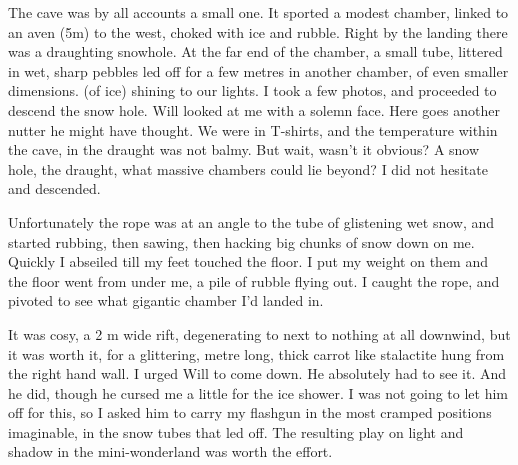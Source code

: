 The cave was by all accounts a small one. It sported a modest chamber, linked to an aven (5m) to the west, choked with ice and rubble. Right by the landing there was a draughting snowhole. At the far end of the chamber, a small tube, littered in wet, sharp pebbles led off for  a few metres in another chamber, of even smaller dimensions.  (of ice) shining to our lights. I took a few photos, and proceeded to descend the snow hole. Will looked at me with a solemn face. Here goes another nutter he might have thought. We were in T-shirts, and the temperature within the cave, in the draught was not balmy. But wait, wasn't it obvious? A snow hole, the draught, what massive chambers could lie beyond? I did not hesitate and descended.

Unfortunately the rope was at an angle to the tube of glistening wet snow, and started rubbing, then sawing, then hacking big chunks of snow down on me. Quickly I abseiled till my feet touched the floor. I put my weight on them and the floor went from under me, a pile of rubble flying out. I caught the rope, and pivoted to see what gigantic chamber I'd landed in. 

It was cosy, a 2 m wide rift, degenerating to next to nothing at all downwind, but it was worth it, for a glittering, metre long, thick carrot like stalactite hung from the right hand wall. I urged Will to come down. He absolutely had to see it. And he did, though he cursed me a little for the ice shower. I was not going to let him off for this, so I asked him to carry my flashgun in the most cramped positions imaginable, in the snow tubes that led off. The resulting play on light and shadow in the mini-wonderland was worth the effort. 




